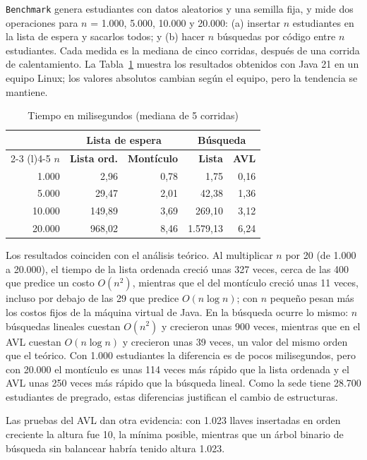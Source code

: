 \documentclass[conference]{IEEEtran}
\begin{document}
\texttt{Benchmark} genera estudiantes con datos aleatorios y una semilla fija, y mide dos operaciones para $n$ = 1.000, 5.000, 10.000 y 20.000: (a) insertar $n$ estudiantes en la lista de espera y sacarlos todos; y (b) hacer $n$ búsquedas por código entre $n$ estudiantes. Cada medida es la mediana de cinco corridas, después de una corrida de calentamiento. La Tabla~\ref{tab:tiempos} muestra los resultados obtenidos con Java 21 en un equipo Linux; los valores absolutos cambian según el equipo, pero la tendencia se mantiene.

\begin{table}[htbp]
\caption{Tiempo en milisegundos (mediana de 5 corridas)}
\label{tab:tiempos}
\centering
\footnotesize
\begin{tabular}{@{}r r r r r@{}}
\toprule
& \multicolumn{2}{c}{\textbf{Lista de espera}} & \multicolumn{2}{c}{\textbf{Búsqueda}} \\
\cmidrule(lr){2-3} \cmidrule(l){4-5}
$n$ & \textbf{Lista ord.} & \textbf{Montículo} & \textbf{Lista} & \textbf{AVL} \\
\midrule
1.000 & 2,96 & 0,78 & 1,75 & 0,16 \\
5.000 & 29,47 & 2,01 & 42,38 & 1,36 \\
10.000 & 149,89 & 3,69 & 269,10 & 3,12 \\
20.000 & 968,02 & 8,46 & 1.579,13 & 6,24 \\
\bottomrule
\end{tabular}
\end{table}

Los resultados coinciden con el análisis teórico. Al multiplicar $n$ por 20 (de 1.000 a 20.000), el tiempo de la lista ordenada creció unas 327 veces, cerca de las 400 que predice un costo $O(n^2)$, mientras que el del montículo creció unas 11 veces, incluso por debajo de las 29 que predice $O(n \log n)$; con $n$ pequeño pesan más los costos fijos de la máquina virtual de Java. En la búsqueda ocurre lo mismo: $n$ búsquedas lineales cuestan $O(n^2)$ y crecieron unas 900 veces, mientras que en el AVL cuestan $O(n \log n)$ y crecieron unas 39 veces, un valor del mismo orden que el teórico. Con 1.000 estudiantes la diferencia es de pocos milisegundos, pero con 20.000 el montículo es unas 114 veces más rápido que la lista ordenada y el AVL unas 250 veces más rápido que la búsqueda lineal. Como la sede tiene 28.700 estudiantes de pregrado, estas diferencias justifican el cambio de estructuras.

Las pruebas del AVL dan otra evidencia: con 1.023 llaves insertadas en orden creciente la altura fue 10, la mínima posible, mientras que un árbol binario de búsqueda sin balancear habría tenido altura 1.023.
\end{document}
